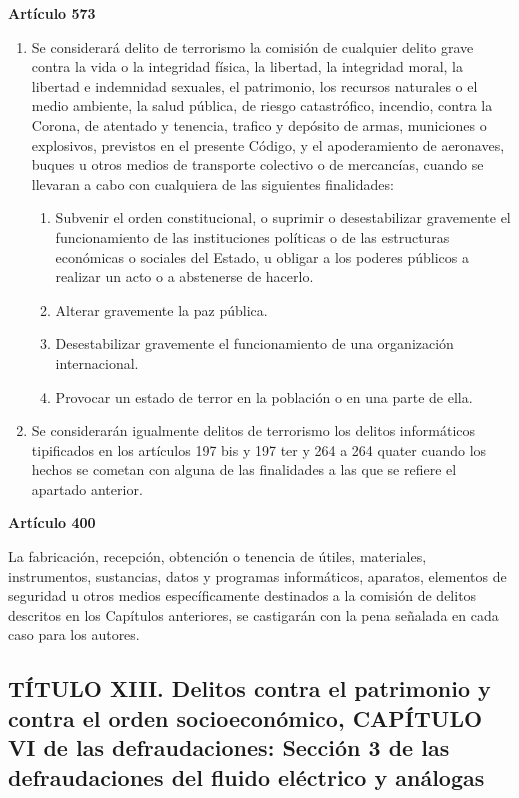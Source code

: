 \textbf{Artículo 573}
\begin{enumerate}[label=\textbf{\arabic*.}]
    \item Se considerará delito de terrorismo la comisión de cualquier delito grave contra la vida o la integridad física, la libertad, la integridad moral, la libertad e indemnidad sexuales, el patrimonio, los recursos naturales o el medio ambiente, la salud pública, de riesgo catastrófico, incendio, contra la Corona, de atentado y tenencia, trafico y depósito de armas, municiones o explosivos, previstos en el presente Código, y el apoderamiento de aeronaves, buques u otros medios de transporte colectivo o de mercancías, cuando se llevaran a cabo con cualquiera de las siguientes finalidades:
          \begin{enumerate}[label=\arabic*.a]
              \item Subvenir el orden constitucional, o suprimir o desestabilizar gravemente el funcionamiento de las instituciones políticas o de las estructuras económicas o sociales del Estado, u obligar a los poderes públicos a realizar un acto o a abstenerse de hacerlo.
              \item Alterar gravemente la paz pública.
              \item Desestabilizar gravemente el funcionamiento de una organización internacional.
              \item Provocar un estado de terror en la población o en una parte de ella.
          \end{enumerate}
    \item Se considerarán igualmente delitos de terrorismo los delitos informáticos tipificados en los artículos 197 bis y 197 ter y 264 a 264 quater cuando los hechos se cometan con alguna de las finalidades a las que se refiere el apartado anterior.
\end{enumerate}

\textbf{Artículo 400}

La fabricación, recepción, obtención o tenencia de útiles, materiales, instrumentos, sustancias, datos y programas informáticos, aparatos, elementos de seguridad u otros medios específicamente destinados a la comisión de delitos descritos en los Capítulos anteriores, se castigarán con la pena señalada en cada caso para los autores.


\subsection{TÍTULO XIII. Delitos contra el patrimonio y contra el orden socioeconómico, CAPÍTULO VI de las defraudaciones: Sección 3 de las defraudaciones del fluido eléctrico y análogas}

